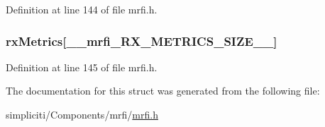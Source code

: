 \-Definition at line 144 of file mrfi.\-h.

\hypertarget{structmrfiPacket__t_a8b95fbda90600ec59752a405fd198770}{
\subsubsection[{rx\-Metrics}]{ {\bf rx\-Metrics}\mbox{[}\-\_\-\-\_\-mrfi\-\_\-\-R\-X\-\_\-\-M\-E\-T\-R\-I\-C\-S\-\_\-\-S\-I\-Z\-E\-\_\-\-\_\-\mbox{]}}}\label{structmrfiPacket__t_a8b95fbda90600ec59752a405fd198770}


\-Definition at line 145 of file mrfi.\-h.



\-The documentation for this struct was generated from the following file\-:\begin{DoxyCompactItemize}
\item 
simpliciti/\-Components/mrfi/\hyperlink{mrfi_8h}{mrfi.\-h}\end{DoxyCompactItemize}
